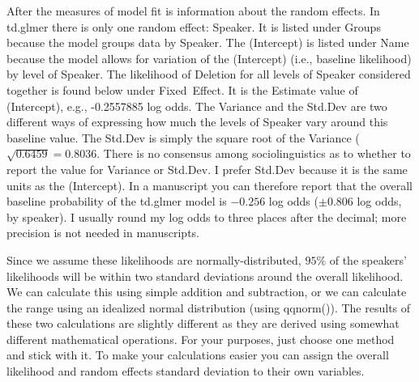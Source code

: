 \documentclass[
  10pt,
  letterpaper]{article}
\renewcommand\texttt[1]{{\ttfamily\color{BrickRed}#1}}
\begin{document}
After the measures of model fit is information about the random effects.
In \texttt{td.glmer} there is only one random effect: \texttt{Speaker}.
It is listed under \texttt{Groups} because the model groups data by
\texttt{Speaker}. The \texttt{(Intercept)} is listed under \texttt{Name}
because the model allows for variation of the \texttt{(Intercept)}
(i.e., baseline likelihood) by level of \texttt{Speaker}. The likelihood
of \texttt{Deletion} for all levels of \texttt{Speaker} considered
together is found below under \texttt{Fixed\ Effect}. It is the
\texttt{Estimate} value of \texttt{(Intercept)}, e.g., -0.2557885 log
odds. The \texttt{Variance} and the \texttt{Std.Dev} are two different
ways of expressing how much the levels of \texttt{Speaker} vary around
this baseline value. The \texttt{Std.Dev} is simply the square root of
the \texttt{Variance} (\(\sqrt{0.6459} = 0.8036\). There is no consensus
among sociolinguistics as to whether to report the value for
\texttt{Variance} or \texttt{Std.Dev}. I prefer \texttt{Std.Dev} because
it is the same units as the \texttt{(Intercept)}. In a manuscript you
can therefore report that the overall baseline probability of the
\texttt{td.glmer} model is \(-0.256\) log odds (\(\pm 0.806\) log odds,
by speaker). I usually round my log odds to three places after the
decimal; more precision is not needed in manuscripts.

Since we assume these likelihoods are normally-distributed, \(95\%\) of
the speakers' likelihoods will be within two standard deviations around
the overall likelihood. We can calculate this using simple addition and
subtraction, or we can calculate the range using an idealized normal
distribution (using \texttt{qqnorm()}). The results of these two
calculations are slightly different as they are derived using somewhat
different mathematical operations. For your purposes, just choose one
method and stick with it. To make your calculations easier you can
assign the overall likelihood and random effects standard deviation to
their own variables.
\end{document}
